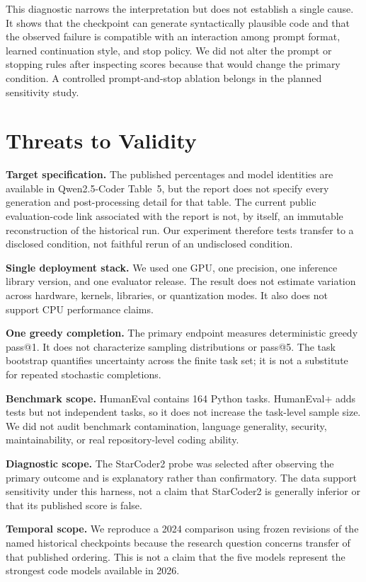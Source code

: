 \documentclass[10pt,twocolumn]{article}
\begin{document}
This diagnostic narrows the interpretation but does not establish a single cause. It shows that the checkpoint can generate syntactically plausible code and that the observed failure is compatible with an interaction among prompt format, learned continuation style, and stop policy. We did not alter the prompt or stopping rules after inspecting scores because that would change the primary condition. A controlled prompt-and-stop ablation belongs in the planned sensitivity study.

\section{Threats to Validity}

\textbf{Target specification.} The published percentages and model identities are available in Qwen2.5-Coder Table~5, but the report does not specify every generation and post-processing detail for that table. The current public evaluation-code link associated with the report is not, by itself, an immutable reconstruction of the historical run. Our experiment therefore tests transfer to a disclosed condition, not faithful rerun of an undisclosed condition.

\textbf{Single deployment stack.} We used one GPU, one precision, one inference library version, and one evaluator release. The result does not estimate variation across hardware, kernels, libraries, or quantization modes. It also does not support CPU performance claims.

\textbf{One greedy completion.} The primary endpoint measures deterministic greedy pass@1. It does not characterize sampling distributions or pass@5. The task bootstrap quantifies uncertainty across the finite task set; it is not a substitute for repeated stochastic completions.

\textbf{Benchmark scope.} HumanEval contains 164 Python tasks. HumanEval+ adds tests but not independent tasks, so it does not increase the task-level sample size. We did not audit benchmark contamination, language generality, security, maintainability, or real repository-level coding ability.

\textbf{Diagnostic scope.} The StarCoder2 probe was selected after observing the primary outcome and is explanatory rather than confirmatory. The data support sensitivity under this harness, not a claim that StarCoder2 is generally inferior or that its published score is false.

\textbf{Temporal scope.} We reproduce a 2024 comparison using frozen revisions of the named historical checkpoints because the research question concerns transfer of that published ordering. This is not a claim that the five models represent the strongest code models available in 2026.
\end{document}
